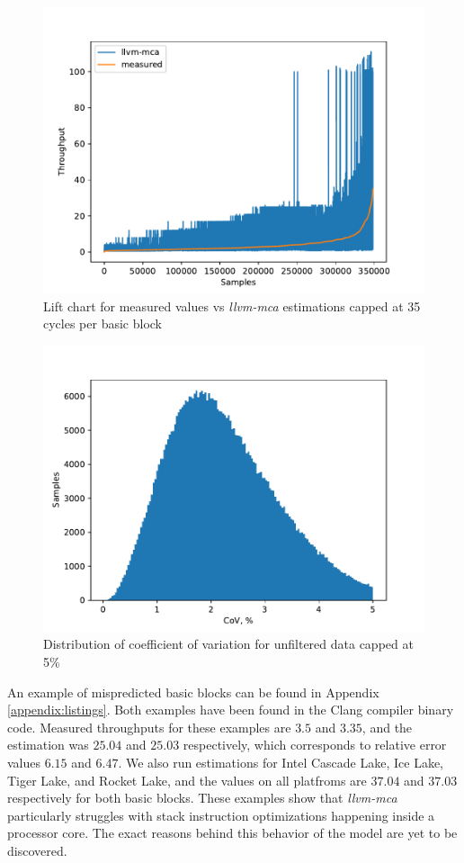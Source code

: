 \begin{figure}[h]
  \centering
  \includegraphics[width=0.9\columnwidth]{lift_chart_35_cycles}
  \caption{Lift chart for measured values vs \textit{llvm-mca} estimations capped at 35 cycles per basic block}
  \label{fig:lift_chart}
\end{figure}

\begin{figure}[h]
  \centering
  \includegraphics[width=0.9\columnwidth]{cov_distribution_zoom}
  \caption{Distribution of coefficient of variation for unfiltered data capped at 5\%}
  \label{fig:cov}
\end{figure}

An example of mispredicted basic blocks can be found in Appendix \ref{appendix:listings}.
Both examples have been found in the Clang compiler binary code. Measured throughputs for these
examples are $3.5$ and $3.35$, and the estimation was $25.04$ and $25.03$ respectively, which
corresponds to relative error values $6.15$ and $6.47$. We also run estimations for Intel Cascade Lake,
Ice Lake, Tiger Lake, and Rocket Lake, and the values on all platfroms are $37.04$ and $37.03$ respectively
for both basic blocks. These examples show that \textit{llvm-mca} particularly struggles with stack instruction
optimizations happening inside a processor core. The exact reasons behind this behavior of the model are
yet to be discovered.


